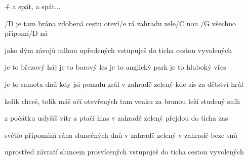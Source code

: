 \r + a spát, a spát...




/D je tam brána zdobená
cestu oteví/e rá
zahradu zele/C nou
/G všechno připomí/D ná \s

jako dým závojů
mlhou upředených
vstupuješ do ticha
cestou vyvolených \s

je to březový háj
je to borový les
je to anglický park
je to hluboký vřes \s

je to samota dnů
kdy jsi pomalu zrál
v zahradě zelený
kde sis za dětství hrál \s

kolik chceš, tolik máš
očí otevřených
tam venku za branou
leží studený sníh \s

z počátku uslyšíš
vítr a ptačí hlas
v zahradě zelený
přejdou do ticha zas \s

světlo připomíná
rána slunečných dnů
v zahradě zelený
v zahradě beze snů \s

uprostřed závratí
sluncem prosvícených
vstupuješ do ticha
cestou vyvolených \songgg



\bye
